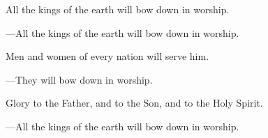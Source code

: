 \responsory

\begin{hangpar}
All the kings of the earth will bow down in worship.

{\color{red}---\thinspace }All the kings of the earth will bow down in worship.

\medskip Men and women of every nation will serve him.

{\color{red}---\thinspace }They will bow down in worship.

\medskip Glory to the Father, and to the Son, and to the Holy Spirit.

{\color{red}---\thinspace }All the kings of the earth will bow down in worship.
\end{hangpar}